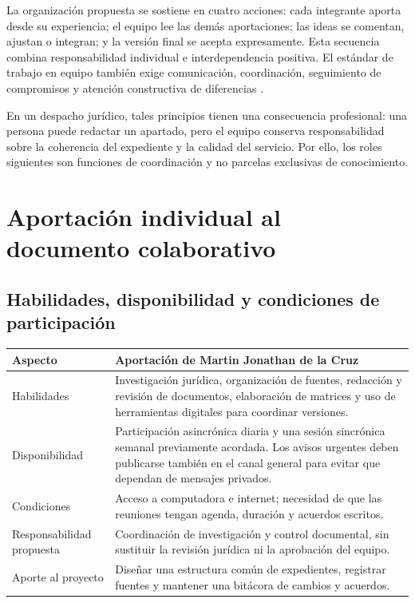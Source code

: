\documentclass[
  spanish,
  letterpaper, oneside
]{article}
\begin{document}
La organización propuesta se sostiene en cuatro acciones: cada integrante aporta
desde su experiencia; el equipo lee las demás aportaciones; las ideas se comentan,
ajustan o integran; y la versión final se acepta expresamente. Esta secuencia combina
responsabilidad individual e interdependencia positiva. El estándar de trabajo en
equipo también exige comunicación, coordinación, seguimiento de compromisos y
atención constructiva de diferencias \citep{conocer2025ec0554}.

En un despacho jurídico, tales principios tienen una consecuencia profesional: una
persona puede redactar un apartado, pero el equipo conserva responsabilidad sobre la
coherencia del expediente y la calidad del servicio. Por ello, los roles siguientes
son funciones de coordinación y no parcelas exclusivas de conocimiento.

\section{Aportación individual al documento colaborativo}

\subsection{Habilidades, disponibilidad y condiciones de participación}

\begin{longtable}{p{3.2cm}p{10.4cm}}
\toprule
\textbf{Aspecto} & \textbf{Aportación de Martin Jonathan de la Cruz} \\
\midrule
Habilidades & Investigación jurídica, organización de fuentes, redacción y revisión de documentos, elaboración de matrices y uso de herramientas digitales para coordinar versiones. \\
Disponibilidad & Participación asincrónica diaria y una sesión sincrónica semanal previamente acordada. Los avisos urgentes deben publicarse también en el canal general para evitar que dependan de mensajes privados. \\
Condiciones & Acceso a computadora e internet; necesidad de que las reuniones tengan agenda, duración y acuerdos escritos. \\
Responsabilidad propuesta & Coordinación de investigación y control documental, sin sustituir la revisión jurídica ni la aprobación del equipo. \\
Aporte al proyecto & Diseñar una estructura común de expedientes, registrar fuentes y mantener una bitácora de cambios y acuerdos. \\
\bottomrule
\end{longtable}
\end{document}
